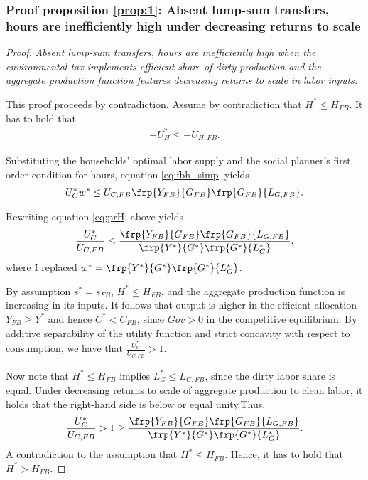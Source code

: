 \subsubsection{Proof proposition \ref{prop:1}: Absent lump-sum transfers, hours are inefficiently high under decreasing returns to scale}\label{app:nolumpsum_hourshigh}
\begin{proof}\textit{Absent lump-sum transfers, hours are inefficiently high when the environmental tax implements efficient share of dirty production and the aggregate production function features decreasing returns to scale in labor inputs.}
	
	This proof proceeds by contradiction. 
	Assume by contradiction that $H^*\leq H_{FB}$. 
	It has to hold that 
	\begin{align}
	-U_H^*\leq -U_{H,FB}.
	\end{align} 
	
	Substituting the households' optimal labor supply and the social planner's first order condition for hours, equation \ref{eq:fbh_simp} yields
	\begin{align}\label{eq:prH}
	U_C^*w^* \leq U_{C,FB}\frp{Y_{FB}}{G_{FB}}\frp{G_{FB}}{L_{G,FB}}.
	\end{align}
	
	Rewriting equation \ref{eq:prH} above yields
	\begin{align}
	\frac{U_C^*}{U_{C,FB}}\leq \frac{\frp{Y_{FB}}{G_{FB}}\frp{G_{FB}}{L_{G,FB}}}{\frp{Y^*}{G^*}\frp{G^*}{L^*_{G}}},
	\end{align}
	where I replaced $w^*=\frp{Y^*}{G^*}\frp{G^*}{L^*_{G}}$.
	
	By assumption $s^*=s_{FB}$, $H^*\leq H_{FB}$, and the aggregate production function is increasing in its inputs. It follows that output is higher in the efficient allocation $Y_{FB}\geq Y^*$ and hence $C^*<C_{FB}$, since $Gov>0$ in the competitive equilibrium. By additive separability of the utility function and strict concavity with respect to consumption, we have that $\frac{U_C^*}{U_{C,FB}}>1$.
	
	Now note that $H^*\leq H_{FB}$ implies  $L_G^*\leq L_{G,FB}$, since the dirty labor share is equal. Under decreasing returns to scale of aggregate production to clean labor, it holds that the right-hand side is below or equal unity.Thus,
	\begin{align}
	\frac{U_C^*}{U_{C,FB}}>1\geq \frac{\frp{Y_{FB}}{G_{FB}}\frp{G_{FB}}{L_{G,FB}}}{\frp{Y^*}{G^*}\frp{G^*}{L^*_{G}}}. 
	\end{align}
	A contradiction to the assumption that $H^*\leq H_{FB}$. Hence, it has to hold that $H^*>H_{FB}$. 
\end{proof}


